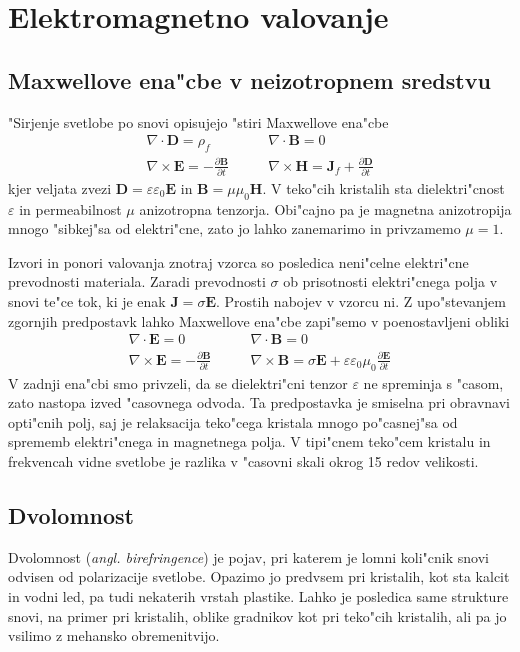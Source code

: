 \documentclass[a4paper,10pt]{article}
\newcommand{\odvod}[2]{\frac{\partial #1}{\partial #2}}
\renewcommand{\vec}{\mathbf}
\newcommand{\angl}[1]{(\textit{angl. #1})}
\begin{document}
\section{Elektromagnetno valovanje}

\subsection{Maxwellove ena"cbe v neizotropnem sredstvu}
"Sirjenje svetlobe po snovi opisujejo "stiri Maxwellove ena"cbe
\begin{equation}
\begin{aligned}
 \nabla \cdot \vec D = \rho_f & \qquad \nabla \cdot \vec B = 0 \\
 \nabla \times \vec E = -\odvod{\vec B}{t} & \qquad \nabla \times \vec H = \vec J_f + \odvod{\vec D}{t}
\end{aligned} 
\end{equation}
kjer veljata zvezi $\vec D = \varepsilon \varepsilon_0 \vec E$ in $\vec B = \mu \mu_0 \vec H$. 
V teko"cih kristalih sta dielektri"cnost $\varepsilon$ in permeabilnost $\mu$ anizotropna tenzorja. 
Obi"cajno pa je magnetna anizotropija mnogo "sibkej"sa od elektri"cne, zato jo lahko zanemarimo in privzamemo $\mu = 1$. 

Izvori in ponori valovanja znotraj vzorca so posledica neni"celne elektri"cne prevodnosti materiala.
Zaradi prevodnosti $\sigma$ ob prisotnosti elektri"cnega polja v snovi te"ce tok, ki je enak $\vec J = \sigma \vec E$. 
Prostih nabojev v vzorcu ni. Z upo"stevanjem zgornjih predpostavk lahko Maxwellove ena"cbe zapi"semo v poenostavljeni obliki
\begin{equation}
  \begin{aligned}
  \nabla \cdot \vec E = 0 & \qquad \nabla \cdot \vec B = 0 \\
  \nabla \times \vec E = -\odvod{\vec B}{t} & \qquad \nabla \times \vec B = \sigma \vec E + \varepsilon\varepsilon_0\mu_0\odvod{\vec E}{t}
  \end{aligned}
\end{equation}
V zadnji ena"cbi smo privzeli, da se dielektri"cni tenzor $\varepsilon$ ne spreminja s "casom, zato nastopa izved "casovnega odvoda. 
Ta predpostavka je smiselna pri obravnavi opti"cnih polj, saj je relaksacija teko"cega kristala mnogo po"casnej"sa od sprememb elektri"cnega in magnetnega polja. 
V tipi"cnem teko"cem kristalu in frekvencah vidne svetlobe je razlika v "casovni skali okrog 15 redov velikosti. 

\subsection{Dvolomnost}
Dvolomnost \angl{birefringence} je pojav, pri katerem je lomni koli"cnik snovi odvisen od polarizacije svetlobe\cite{landau-lifsic-optics, wiki:birefringence}. 
Opazimo jo predvsem pri kristalih, kot sta kalcit in vodni led, pa tudi nekaterih vrstah plastike. 
Lahko je posledica same strukture snovi, na primer pri kristalih, oblike gradnikov kot pri teko"cih kristalih, ali pa jo vsilimo z mehansko obremenitvijo. 
\end{document}
